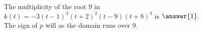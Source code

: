 \documentclass{ximera}
\begin{document}
\begin{exercise}
\begin{question}



The multiplicity of the root $9$ in $k(t) = -3(t - 1)^3 (t + 2)^2 (t - 9) (t + 8)^3$ is $\answer{1}$. \\



The sign of $p$ will  as the domain runs over $9$.


\end{question}














\end{exercise}
\end{document}
